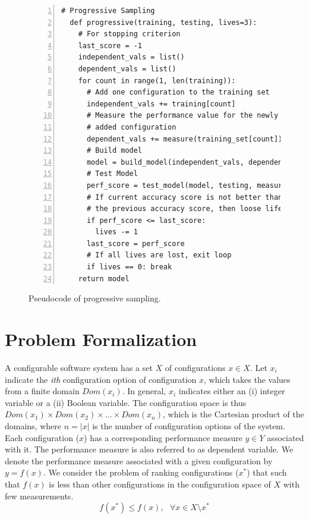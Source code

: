 \documentclass[sigconf]{acmart}
\begin{document}
\begin{figure}[t]
\small
\hspace{0.2cm}\begin{lstlisting}[xleftmargin=5.0ex,mathescape,frame=none,numbers=left]
  # Progressive Sampling
  def progressive(training, testing, lives=3): 
    # For stopping criterion
    last_score = -1
    independent_vals = list()
    dependent_vals = list()
    for count in range(1, len(training)):    
      # Add one configuration to the training set
      independent_vals += training[count]      
      # Measure the performance value for the newly
      # added configuration 
      dependent_vals += measure(training_set[count])  
      # Build model
      model = build_model(independent_vals, dependent_vals)      
      # Test Model
      perf_score = test_model(model, testing, measure(testing))
      # If current accuracy score is not better than
      # the previous accuracy score, then loose life
      if perf_score <= last_score:
        lives -= 1
      last_score = perf_score
      # If all lives are lost, exit loop
      if lives == 0: break 
    return model
\end{lstlisting}
\caption{\small{Pseudocode of progressive sampling.}}
\label{fig:progressive_sampling}  
\end{figure}

\section{Problem Formalization}\label{sec:problem_formal}

A configurable software system has a set $X$ of configurations $x \in X$. Let $x_i$ indicate the \textit{ith} configuration option of configuration $x$, which takes the values from a finite domain $Dom(x_i)$. In general, $x_i$ indicates either an (i) integer variable or a (ii) Boolean variable. The configuration space is thus $Dom(x_1) \times Dom(x_2) \times ... \times Dom(x_n)$, which is the Cartesian product of the domains, where $n = |x|$ is the number of configuration options of the system. Each configuration ($x$) has a corresponding performance measure $y \in Y$ associated with it. The performance measure is also referred to as dependent variable. We denote the performance measure associated with a given configuration by $y=f(x)$.  We consider the problem of ranking  configurations ($x^*$) that such that $f(x)$ is less than other configurations in the configuration space of $X$ with few measurements.
\begin{equation}
    f(x^*) \le f(x),~~~ \forall x \in {X\setminus x^*}
\end{equation}
 
\end{document}
